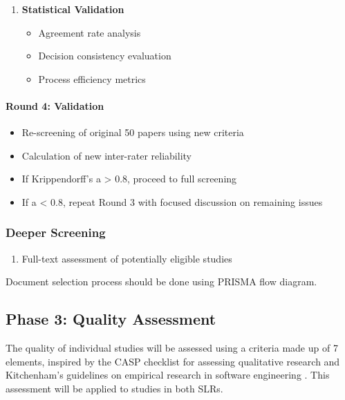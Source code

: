 \documentclass[a4paper,12pt]{article}
\begin{document}
\begin{enumerate}
\begin{enumerate}
    \item \textbf{Statistical Validation}
    \begin{itemize}
        \item Agreement rate analysis
        \item Decision consistency evaluation
        \item Process efficiency metrics
    \end{itemize}
\end{enumerate}




    
    \paragraph{Round 4: Validation}
    \begin{itemize}
        \item Re-screening of original 50 papers using new criteria
        \item Calculation of new inter-rater reliability
        \item If Krippendorff's a > 0.8, proceed to full screening
        \item If a < 0.8, repeat Round 3 with focused discussion on remaining issues
    \end{itemize}
\end{enumerate}

\subsubsection{Deeper Screening}

\begin{enumerate}
    \item Full-text assessment of potentially eligible studies
\end{enumerate}


Document selection process should be done using PRISMA flow diagram.



\subsection{Phase 3: Quality Assessment}
The quality of individual studies will be assessed using a criteria made up of 7 elements, inspired by the CASP checklist for assessing qualitative research and Kitchenham's guidelines on empirical research in software engineering . This assessment will be applied to studies in both SLRs.
\end{document}
